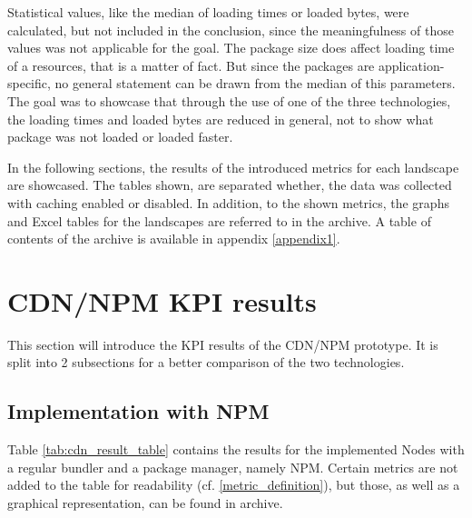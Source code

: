 Statistical values, like the median of loading times or loaded bytes, were calculated, but not included in the conclusion, since the meaningfulness of those values was not applicable for the goal. The package size does affect loading time of a resources, that is a matter of fact. But since the packages are application-specific, no general statement can be drawn from the median of this parameters. The goal was to showcase that through the use of one of the three technologies, the loading times and loaded bytes are reduced in general, not to show what package was not loaded or loaded faster.

In the following sections, the results of the introduced metrics for each landscape are showcased. 
The tables shown, are separated whether, the data was collected with caching enabled or disabled. 
In addition, to the shown metrics, the graphs and Excel tables for the landscapes are referred to in the archive.
A table of contents of the archive is available in appendix \ref{appendix1}.

\section{CDN/NPM KPI results}

This section will introduce the KPI results of the CDN/NPM prototype. It is split into 2 subsections for a better comparison of the two technologies.

\subsection{Implementation with NPM}

Table \ref{tab:cdn_result_table} contains the results for the implemented Nodes with a regular bundler and a package manager, namely NPM. 
Certain metrics are not added to the table for readability (cf. \ref{metric_definition}), but those, as well as a graphical representation, can be found in archive. 

\scriptsize
\setlength{\mycolwidth}{\dimexpr \textwidth/5 - 2\tabcolsep}

